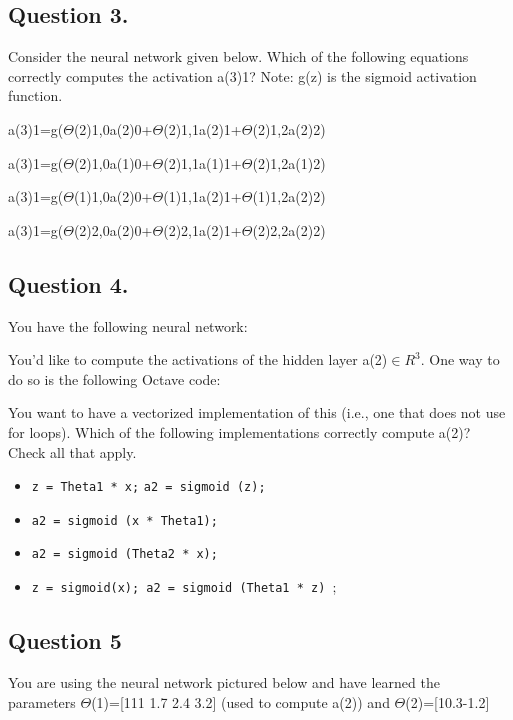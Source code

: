 \documentclass[11pt]{article} %
\begin{document}
\subsection*{Question 3. }
Consider the neural network given below. Which of the following equations correctly computes the activation a(3)1? Note: g(z) is the sigmoid activation function.



a(3)1=g($\Theta$(2)1,0a(2)0+$\Theta$(2)1,1a(2)1+$\Theta$(2)1,2a(2)2)

a(3)1=g($\Theta$(2)1,0a(1)0+$\Theta$(2)1,1a(1)1+$\Theta$(2)1,2a(1)2)

a(3)1=g($\Theta$(1)1,0a(2)0+$\Theta$(1)1,1a(2)1+$\Theta$(1)1,2a(2)2)

a(3)1=g($\Theta$(2)2,0a(2)0+$\Theta$(2)2,1a(2)1+$\Theta$(2)2,2a(2)2)
\subsection*{Question 4. }
You have the following neural network:


You'd like to compute the activations of the hidden layer a(2)$\in R^3$. One way to do so is the following Octave code:


You want to have a vectorized implementation of this (i.e., one that does not use for loops). Which of the following implementations correctly compute a(2)? Check all that apply.

\begin{itemize}
\item \texttt{z = Theta1 * x;} \texttt{a2 = sigmoid (z);}

\item \texttt{a2 = sigmoid (x * Theta1);}

\item \texttt{a2 = sigmoid (Theta2 * x);}

\item \texttt{z = sigmoid(x); a2 = sigmoid (Theta1 * z) };
\end{itemize}


\subsection*{Question 5}

You are using the neural network pictured below and have learned the parameters 
$\Theta$(1)=[111 1.7 2.4 3.2] 
(used to compute a(2)) and $\Theta$(2)=[10.3-1.2] 
\end{document}
